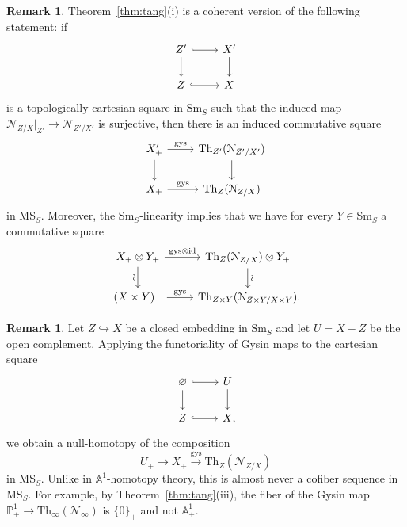 \documentclass{amsart}
\numberwithin{equation}{section}
\theoremstyle{plain}
\theoremstyle{definition}
\newtheorem{remark}[equation]{Remark}
\let\scr=\mathcal
\let\bb=\mathbb
\def\A{\bb A}
\def\P{\bb P}
\let\into=\hookrightarrow
\let\emptyset=\varnothing
\def\id{\mathrm{id}}
\def\Th{\mathrm{Th}}
\let\cat=\mathrm
\def\Sm{{\cat{S}\mathrm{m}}}
\def\MS{\mathrm{MS}}
\def\gys{\mathrm{gys}{}}
\begin{document}
\begin{remark}
Theorem~\ref{thm:tang}(i) is a coherent version of the following statement: if
\[
\begin{tikzcd}
Z' \arrow[r,hookrightarrow]{} \arrow[d] & X' \arrow[d]\\
Z \arrow[r,hookrightarrow]{} & X
\end{tikzcd}
\]
is a topologically cartesian square in $\Sm_S$ such that the induced map $\scr N_{Z/X} \vert_{Z'} \to \scr N_{Z'/X'}$ is surjective, then there is an induced commutative square
\[
\begin{tikzcd}
X'_+ \arrow[r]{}{\gys} \arrow[d] & \Th_{Z'}(\scr N_{Z'/X'}) \arrow[d] \\
X_+ \arrow[r]{}{\gys} & \Th_Z(\scr N_{Z/X})
\end{tikzcd}
\]
in $\MS_S$. Moreover, the $\Sm_S$-linearity implies that we have for every $Y\in\Sm_S$ a commutative square
\[
\begin{tikzcd}
	X_+\otimes Y_+ \ar{r}{\gys\otimes \id} \ar{d}[swap,sloped]{\sim} & \Th_Z(\scr N_{Z/X}) \otimes Y_+ \ar{d}[sloped]{\sim} \\
	(X\times Y)_+ \ar{r}{\gys} & \Th_{Z\times Y}(\scr N_{Z\times Y/X\times Y})\rlap.
\end{tikzcd}
\]
\end{remark}

\begin{remark}\label{rmk:purity}
	Let $Z\into X$ be a closed embedding in $\Sm_S$ and let $U=X-Z$ be the open complement.
	Applying the functoriality of Gysin maps to the cartesian square
	\[
	\begin{tikzcd}
		\emptyset \ar[hook]{r} \ar{d} & U \ar{d} \\
		Z \ar[hook]{r} & X\rlap,
	\end{tikzcd}
	\]
	we obtain a null-homotopy of the composition
	\[
	U_+\to X_+\xrightarrow{\gys} \Th_Z(\scr N_{Z/X})
	\]
	in $\MS_S$. Unlike in $\A^1$-homotopy theory, this is almost never a cofiber sequence in $\MS_S$.
	For example, by Theorem~\ref{thm:tang}(iii), the fiber of the Gysin map $\P^1_+\to\Th_\infty(\scr N_\infty)$ is $\{0\}_+$ and not $\A^1_+$.
\end{remark}
\end{document}
